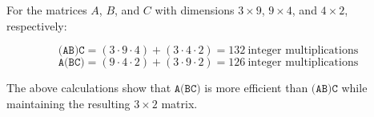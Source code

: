 \documentclass[letterpaper, 12pt]{article}
\begin{document}
For the matrices $A$, $B$, and $C$ with dimensions $3 \times 9$, $9 \times 4$, and $4 \times 2$, respectively:

\[\texttt{(AB)C} = (3 \cdot 9 \cdot 4) + (3 \cdot 4 \cdot 2) = 132 \ \text{integer multiplications}\]
\[\texttt{A(BC)} = (9 \cdot 4 \cdot 2) + (3 \cdot 9 \cdot 2) = 126 \ \text{integer multiplications}\]

The above calculations show that $\texttt{A(BC)}$ is more efficient than $\texttt{(AB)C}$ while maintaining the resulting $3 \times 2$ matrix.
\end{document}
